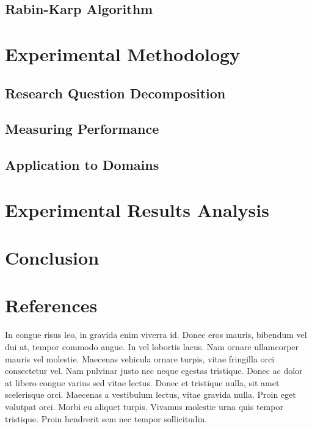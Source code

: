 \documentclass[12pt]{article}
\begin{document}
\subsection{Rabin-Karp Algorithm}


\section{Experimental Methodology}

\subsection{Research Question Decomposition}

\subsection{Measuring Performance}

\subsection{Application to Domains}


\section{Experimental Results Analysis}

\section{Conclusion}

\section{References}





\begin{question}
	In congue risus leo, in gravida enim viverra id. Donec eros mauris, bibendum vel dui at, tempor commodo augue. In vel lobortis lacus. Nam ornare ullamcorper mauris vel molestie. Maecenas vehicula ornare turpis, vitae fringilla orci consectetur vel. Nam pulvinar justo nec neque egestas tristique. Donec ac dolor at libero congue varius sed vitae lectus. Donec et tristique nulla, sit amet scelerisque orci. Maecenas a vestibulum lectus, vitae gravida nulla. Proin eget volutpat orci. Morbi eu aliquet turpis. Vivamus molestie urna quis tempor tristique. Proin hendrerit sem nec tempor sollicitudin.
\end{question}
\end{document}
